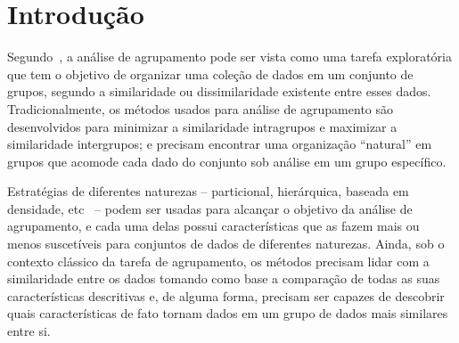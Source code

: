 \documentclass[
    12pt,                %
    oneside,            %
    a4paper,            %
    english,            %
    brazil                %
    ]{abntex2ppgsi}
\begin{document}

\chapter{Introdução}
\label{cap:intro}




Segundo~, a análise de agrupamento pode ser vista como uma tarefa exploratória que tem o objetivo de organizar uma coleção de dados em um conjunto de grupos, segundo a similaridade ou dissimilaridade existente entre esses dados.
Tradicionalmente, os métodos usados para análise de agrupamento são desenvolvidos para minimizar a similaridade intragrupos e maximizar a similaridade intergrupos; e precisam encontrar uma organização ``natural'' em grupos que acomode cada dado do conjunto sob análise em um grupo específico.

Estratégias de diferentes naturezas -- particional, hierárquica, baseada em densidade, etc~\cite{Han2011,Xu2005} -- podem ser usadas para alcançar o objetivo da análise de agrupamento, e cada uma delas possui características que as fazem mais ou menos suscetíveis para conjuntos de dados de diferentes naturezas.
Ainda, sob o contexto clássico da tarefa de agrupamento, os métodos precisam lidar com a similaridade entre os dados tomando como base a comparação de todas as suas características descritivas e, de alguma forma, precisam ser capazes de descobrir quais características de fato tornam dados em um grupo de dados mais similares entre si.
\end{document}
